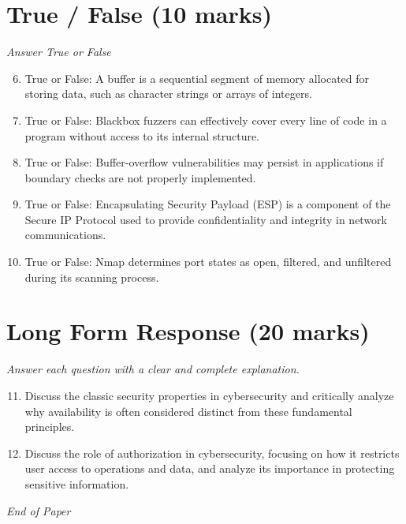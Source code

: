 \documentclass[12pt]{article}
\begin{document}
\section*{True / False (10 marks)}
\textit{Answer True or False}
\begin{enumerate}[label=\arabic*.]
\setcounter{enumi}{5}
\item True or False: A buffer is a sequential segment of memory allocated for storing data, such as character strings or arrays of integers.
\item True or False: Blackbox fuzzers can effectively cover every line of code in a program without access to its internal structure.
\item True or False: Buffer-overflow vulnerabilities may persist in applications if boundary checks are not properly implemented.
\item True or False: Encapsulating Security Payload (ESP) is a component of the Secure IP Protocol used to provide confidentiality and integrity in network communications.
\item True or False: Nmap determines port states as open, filtered, and unfiltered during its scanning process.
\end{enumerate}

\section*{Long Form Response (20 marks)}
\textit{Answer each question with a clear and complete explanation.}
\begin{enumerate}[label=\arabic*.]
\setcounter{enumi}{10}
\item Discuss the classic security properties in cybersecurity and critically analyze why availability is often considered distinct from these fundamental principles.
\item Discuss the role of authorization in cybersecurity, focusing on how it restricts user access to operations and data, and analyze its importance in protecting sensitive information.
\end{enumerate}

\vfill
\noindent\textit{End of Paper}
\end{document}
